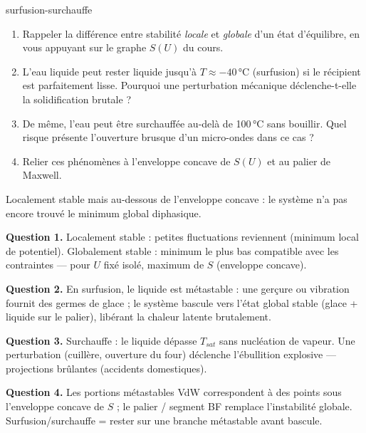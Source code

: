 \begin{exo}{surfusion-surchauffe}

\begin{enumerate}
\item Rappeler la différence entre stabilité \emph{locale} et \emph{globale} d'un état d'équilibre, en vous appuyant sur le graphe $S(U)$ du cours.
\item L'eau liquide peut rester liquide jusqu'à $T \approx -40\,°\text{C}$ (surfusion) si le récipient est parfaitement lisse. Pourquoi une perturbation mécanique déclenche-t-elle la solidification brutale ?
\item De même, l'eau peut être surchauffée au-delà de 100\,$°$C sans bouillir. Quel risque présente l'ouverture brusque d'un micro-ondes dans ce cas ?
\item Relier ces phénomènes à l'enveloppe concave de $S(U)$ et au palier de Maxwell.
\end{enumerate}

\begin{indication}
Localement stable mais au-dessous de l'enveloppe concave : le système n'a pas encore trouvé le minimum global diphasique.
\end{indication}

\begin{solution}
\textbf{Question 1.} Localement stable : petites fluctuations reviennent (minimum local de potentiel). Globalement stable : minimum le plus bas compatible avec les contraintes — pour $U$ fixé isolé, maximum de $S$ (enveloppe concave).

\textbf{Question 2.} En surfusion, le liquide est métastable : une gerçure ou vibration fournit des germes de glace ; le système bascule vers l'état global stable (glace + liquide sur le palier), libérant la chaleur latente brutalement.

\textbf{Question 3.} Surchauffe : le liquide dépasse $T_{sat}$ sans nucléation de vapeur. Une perturbation (cuillère, ouverture du four) déclenche l'ébullition explosive — projections brûlantes (accidents domestiques).

\textbf{Question 4.} Les portions métastables VdW correspondent à des points sous l'enveloppe concave de $S$ ; le palier / segment BF remplace l'instabilité globale. Surfusion/surchauffe = rester sur une branche métastable avant bascule.
\end{solution}
\end{exo}

